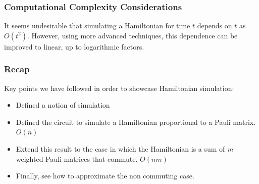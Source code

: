 \documentclass[aspectratio=169,xcolor=dvipsnames]{beamer}
\begin{document}
\begin{frame}
    \frametitle{Computational Complexity Considerations}

    It seems undesirable that simulating a Hamiltonian for time \( t \) depends on \( t \) as \( O(t^2) \).  
    However, using more advanced techniques, this dependence can be improved to linear, up to logarithmic factors.

\end{frame}

\begin{frame}
    \frametitle{Recap}
Key points we have followed in order to showcase Hamiltonian simulation:
    \begin{itemize}
    
        \item Defined a notion of simulation
        \item Defined the circuit to simulate a Hamiltonian proportional to a Pauli matrix. $O(n)$
        \item Extend this result to the case in which the Hamiltonian is a sum of \textit{m} weighted Pauli matrices that commute. $O(nm)$
        \item Finally, see how to approximate the non commuting case.
    \end{itemize}

\end{frame}
\end{document}
